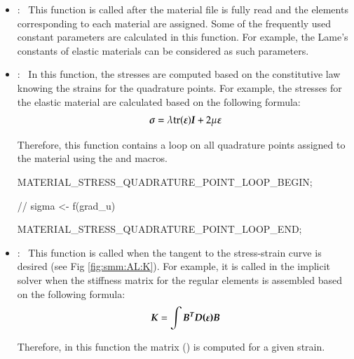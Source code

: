 \begin{itemize}

\item {}:~ This function is called after the material file is
  fully read and the elements corresponding to each material are assigned. Some
  of the frequently used constant parameters are calculated in this
  function. For example, the Lame's constants of elastic materials can be
  considered as such parameters.

\item {}:~ In this function, the stresses are computed based on
  the constitutive law knowing the strains for the quadrature points.  For
  example, the stresses for the elastic material are calculated based on the
  following formula:
  \begin{equation}\label{eqn:smm:constitutive_elastic}
    \boldsymbol{\sigma } =\lambda\mathrm{tr}(\boldsymbol{\varepsilon})\boldsymbol{I}+2 \mu \boldsymbol{\varepsilon}
  \end{equation}

  Therefore, this function contains  a loop on  all quadrature points assigned  to the
  material using the
   and
    macros.

  \begin{cpp}
    MATERIAL_STRESS_QUADRATURE_POINT_LOOP_BEGIN;

    // sigma <- f(grad_u)

    MATERIAL_STRESS_QUADRATURE_POINT_LOOP_END;
  \end{cpp}


\item {}:~ This function is called when the tangent to
  the stress-strain curve is desired (see Fig \ref {fig:smm:AL:K}).  For
  example, it is called in the implicit solver when the stiffness matrix for the
  regular elements is assembled based on the following formula:
  \begin{equation} \label{eqn:smm:constitutive_elasc}
    \boldsymbol{K } =\int{\ensuremath{\boldsymbol{B^T}}\ensuremath{\boldsymbol{D(\varepsilon)}}\ensuremath{\boldsymbol{B}}}
  \end{equation}

  Therefore, in this function the  matrix () is computed
  for a given strain.



\end{itemize}
